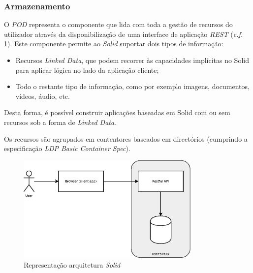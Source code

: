 \subsubsection*{Armazenamento \label{subsection_solid_armazenamento}}
O \emph{\acrshort{POD}} representa o componente que lida com toda a gestão de recursos do utilizador através da disponibilização de uma interface de aplicação \emph{\acrshort{REST}} (\emph{c.f.} \ref{estado_arte_representacao_solid}). Este componente permite ao \emph{Solid} suportar dois tipos de informação:
\begin{itemize}
    \item Recursos \emph{Linked Data}, que podem recorrer às capacidades implícitas no Solid para aplicar lógica no lado da aplicação cliente;
    \item Todo o restante tipo de informação, como por exemplo imagens, documentos, vídeos, áudio, etc.
\end{itemize}

Desta forma, é possível construir aplicações baseadas em Solid com ou sem recursos sob a forma de \emph{Linked Data}\cite{solid_spec}.

Os recursos são agrupados em contentores baseados em directórios (cumprindo a especificação \emph{\acrshort{LDP} Basic Container Spec}\cite{solid_spec}).

\begin{figure}[H]
    \begin{center}
    \includegraphics[width=0.8\textwidth]{figures/estado_arte-Solid.eps}
    \caption{Representação arquitetura \emph{Solid}}
    \label{estado_arte_representacao_solid}
    \end{center}
\end{figure}


